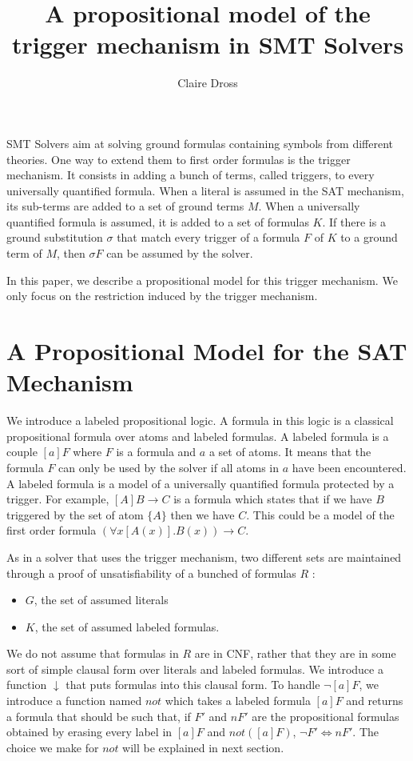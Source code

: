 \documentclass[a4paper,11pt]{article}
\title{A propositional model of the trigger mechanism in SMT Solvers}
\author{Claire Dross}
\newcommand{\nnot}{\mathit{not}}
\begin{document}
\maketitle

\begin{abstract}

\end{abstract}

SMT Solvers aim at solving ground formulas containing symbols from different theories.
One way to extend them to first order formulas is the trigger mechanism. It consists in
adding a bunch of terms, called triggers, to every universally quantified formula.
When a literal is assumed in the SAT mechanism, its sub-terms are added to a set of
ground terms $M$. When a universally quantified formula is assumed, it is added to a set
of formulas $K$. If there is a ground substitution $\sigma$ that match every trigger of a formula
$F$ of $K$ to a ground term of $M$, then $\sigma F$ can be assumed by the solver.

In this paper, we describe a propositional model for this trigger mechanism. We only focus
on the restriction induced by the trigger mechanism. 
\section{A Propositional Model for the SAT Mechanism}
We introduce a labeled propositional logic. A formula in this logic is a classical propositional
formula over atoms and labeled formulas. A labeled formula is a couple $[a]F$ where $F$ is a
formula and $a$ a set of atoms. It means that the formula $F$ can only be used by the solver if
all atoms in $a$ have been encountered. A labeled formula is a model of a universally quantified
formula protected by a trigger. For example, $[A]B\rightarrow C$ is a formula which states that
if we have $B$ triggered by the set of atom $\{A\}$ then we have $C$. This could be a model of
the first order formula $(\forall x [A(x)]. B(x))\rightarrow C$.

As in a solver that uses the trigger mechanism, two different sets are maintained through a
proof of unsatisfiability of a bunched of formulas $R$ :
\begin{itemize}
 \item $G$, the set of assumed literals
 \item $K$, the set of assumed labeled formulas.
\end{itemize}
We do not assume that formulas in $R$ are in CNF, rather that they are in some sort of simple clausal
form over literals and labeled formulas. We introduce a function $\downarrow$ that puts formulas
into this clausal form. To handle $\neg[a]F$, we introduce a function named $\nnot$ which takes
a labeled formula $[a]F$ and returns a formula that should be such that, if $F'$ and $nF'$ are the 	propositional formulas obtained by erasing every label in $[a]F$ and $\nnot([a]F)$,
$\neg F'\Leftrightarrow nF'$. The choice we make for $\nnot$ will be explained in next section.
\end{document}
